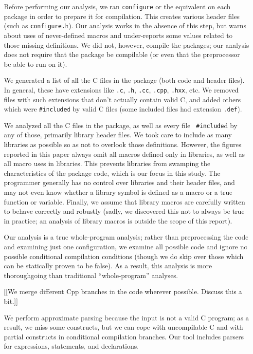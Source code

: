 \documentclass[10pt]{article}
\newcommand{\file}[1]{\texttt{#1}}
\begin{document}
Before performing our analysis, we ran {\tt configure} or the equivalent on
each package in order to prepare it for compilation.  This creates various
header files (such as \file{configure.h}).  Our analysis works in the
absence of this step, but warns about uses of never-defined macros and
under-reports some values related to those missing definitions.  We did
not, however, compile the packages; our analysis does not require that the
package be compilable (or even that the preprocessor be able to run on it).

We generated a list of all the C files in the package (both code and header
files).  In general, these have extensions like \file{.c}, \file{.h},
\file{.cc}, \file{.cpp}, \file{.hxx}, etc.  We removed files with such
extensions that don't actually contain valid C, and added others which were
{\tt \#included} by valid C files (some included files had extension
\file{.def}).

We analyzed all the C files in the package, as well as every file {\tt
\#include}d by any of those, primarily library header files.  We
took care to include as many libraries as possible so as not to overlook
those definitions.  However, the figures reported in this paper always omit
all macros defined only in libraries, as well as all macro uses in
libraries.  This prevents libraries from 
swamping the characteristics of the package code, which is our focus in
this study.  The programmer generally has no control over libraries and
their header files, and may not even know whether a library symbol is
defined as a macro or a true function or variable.  Finally, we assume that
library macros are carefully written to behave correctly and robustly
(sadly, we discovered this not to always be true in practice; an
analysis of library macros is outside the scope of this report).

Our analysis is a true whole-program analysis; rather than preprocessing the
code and examining just one configuration, we examine all possible code and
ignore no possible  conditional compilation conditions (though we do skip
over those which can be statically proven to be false).   As a result, this
analysis is more thoroughgoing than traditional ``whole-program'' analyses.

[[We merge different Cpp branches in the code wherever possible.  Discuss
this a bit.]]

We perform approximate parsing because the input is not a valid C program;
as a result, we miss some constructs, but we can cope with uncompilable C
and with partial constructs in conditional compilation branches.  Our tool
includes parsers for expressions, statements, and declarations.
\end{document}

